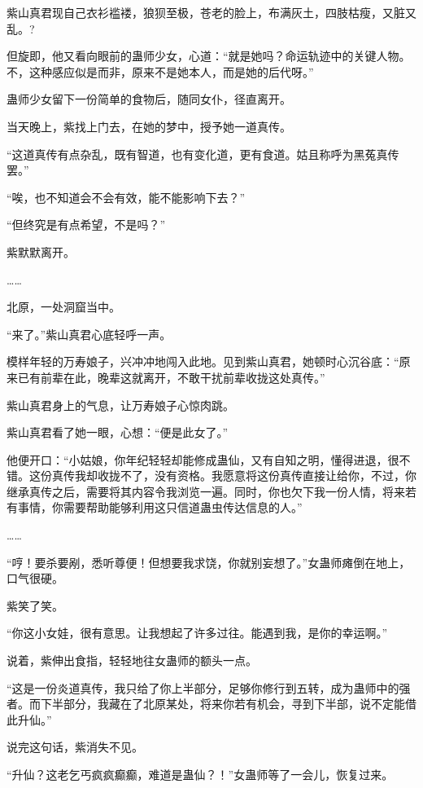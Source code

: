 
\begin{this_body}

紫山真君现自己衣衫褴褛，狼狈至极，苍老的脸上，布满灰土，四肢枯瘦，又脏又乱。?

但旋即，他又看向眼前的蛊师少女，心道：“就是她吗？命运轨迹中的关键人物。不，这种感应似是而非，原来不是她本人，而是她的后代呀。”

蛊师少女留下一份简单的食物后，随同女仆，径直离开。

当天晚上，紫找上门去，在她的梦中，授予她一道真传。

“这道真传有点杂乱，既有智道，也有变化道，更有食道。姑且称呼为黑菟真传罢。”

“唉，也不知道会不会有效，能不能影响下去？”

“但终究是有点希望，不是吗？”

紫默默离开。

……

北原，一处洞窟当中。

“来了。”紫山真君心底轻呼一声。

模样年轻的万寿娘子，兴冲冲地闯入此地。见到紫山真君，她顿时心沉谷底：“原来已有前辈在此，晚辈这就离开，不敢干扰前辈收拢这处真传。”

紫山真君身上的气息，让万寿娘子心惊肉跳。

紫山真君看了她一眼，心想：“便是此女了。”

他便开口：“小姑娘，你年纪轻轻却能修成蛊仙，又有自知之明，懂得进退，很不错。这份真传我却收拢不了，没有资格。我愿意将这份真传直接让给你，不过，你继承真传之后，需要将其内容令我浏览一遍。同时，你也欠下我一份人情，将来若有事情，你需要帮助能够利用这只信道蛊虫传达信息的人。”

……

“哼！要杀要剐，悉听尊便！但想要我求饶，你就别妄想了。”女蛊师瘫倒在地上，口气很硬。

紫笑了笑。

“你这小女娃，很有意思。让我想起了许多过往。能遇到我，是你的幸运啊。”

说着，紫伸出食指，轻轻地往女蛊师的额头一点。

“这是一份炎道真传，我只给了你上半部分，足够你修行到五转，成为蛊师中的强者。而下半部分，我藏在了北原某处，将来你若有机会，寻到下半部，说不定能借此升仙。”

说完这句话，紫消失不见。

“升仙？这老乞丐疯疯癫癫，难道是蛊仙？！”女蛊师等了一会儿，恢复过来。


\end{this_body}

